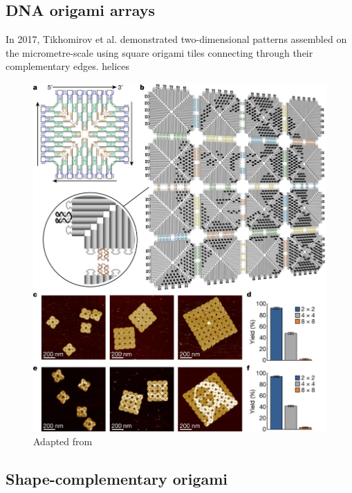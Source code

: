 \subsection{DNA origami arrays}\label{sec:origamiArrays}

In 2017, Tikhomirov et al.\cite{tikhomirov2017fractal} demonstrated two-dimensional patterns assembled on the micrometre-scale using square origami tiles connecting through their complementary edges. helices

\begin{figure}[h]
  \centering\includegraphics[width=\textwidth]{figures/monalisa_tiles.png}
  \caption{Adapted from \cite{tikhomirov2017fractal}}
\end{figure}

\subsection{Shape-complementary origami}

